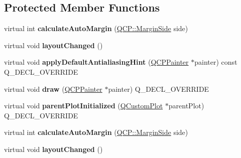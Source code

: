 \subsection*{Protected Member Functions}
\begin{DoxyCompactItemize}
\item 
\mbox{\label{class_q_c_p_layout_element_a005c9f0fe84bc1591a2cf2c46fd477b4}} 
virtual int {\bfseries calculate\+Auto\+Margin} (\hyperlink{namespace_q_c_p_a7e487e3e2ccb62ab7771065bab7cae54}{Q\+C\+P\+::\+Margin\+Side} side)
\item 
\mbox{\label{class_q_c_p_layout_element_a765f041a73af0c2de41b41a5a03e31a4}} 
virtual void {\bfseries layout\+Changed} ()
\item 
\mbox{\label{class_q_c_p_layout_element_a0a8f18141bcf46cf40ad4c13324ff346}} 
virtual void {\bfseries apply\+Default\+Antialiasing\+Hint} (\hyperlink{class_q_c_p_painter}{Q\+C\+P\+Painter} $\ast$painter) const Q\+\_\+\+D\+E\+C\+L\+\_\+\+O\+V\+E\+R\+R\+I\+DE
\item 
\mbox{\label{class_q_c_p_layout_element_ad1c597b1d608cfdd86e7b76819a94cfb}} 
virtual void {\bfseries draw} (\hyperlink{class_q_c_p_painter}{Q\+C\+P\+Painter} $\ast$painter) Q\+\_\+\+D\+E\+C\+L\+\_\+\+O\+V\+E\+R\+R\+I\+DE
\item 
\mbox{\label{class_q_c_p_layout_element_ab4bb5c5a958451f5f153fdce350f13cf}} 
virtual void {\bfseries parent\+Plot\+Initialized} (\hyperlink{class_q_custom_plot}{Q\+Custom\+Plot} $\ast$parent\+Plot) Q\+\_\+\+D\+E\+C\+L\+\_\+\+O\+V\+E\+R\+R\+I\+DE
\item 
\mbox{\label{class_q_c_p_layout_element_a76b2b2f6a68d337b2faa3a9e96c87c9e}} 
virtual int {\bfseries calculate\+Auto\+Margin} (\hyperlink{namespace_q_c_p_a7e487e3e2ccb62ab7771065bab7cae54}{Q\+C\+P\+::\+Margin\+Side} side)
\item 
\mbox{\label{class_q_c_p_layout_element_a11d34c67076e500041dd5448f573bbd5}} 
virtual void {\bfseries layout\+Changed} ()
\item 
\mbox{\label{class_q_c_p_layout_element_a0a8f18141bcf46cf40ad4c13324ff346}} 

\end{DoxyCompactItemize}
